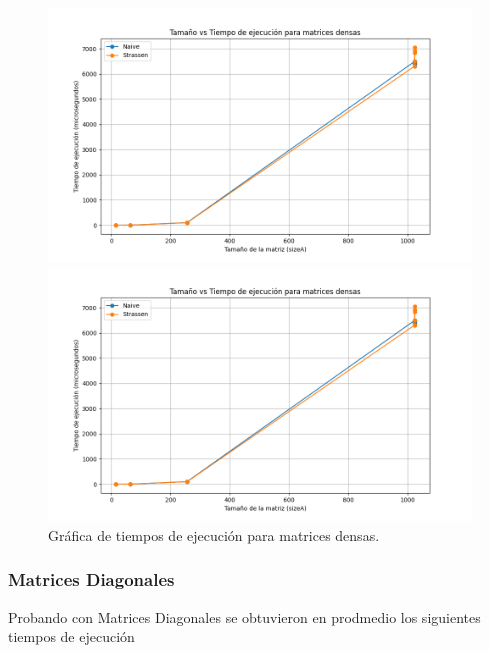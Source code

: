 \begin{figure}[H]
    \centering
    \begin{minipage}[t]{0.5\textwidth}
        \includegraphics[width=\textwidth]{../code/matrix_multiplication/data/plots/dense_matrices_plot.png}
    \end{minipage}%
    \begin{minipage}[t]{0.5\textwidth}
        \includegraphics[width=\textwidth]{../code/matrix_multiplication/data/plots/dense_matrices_plot.png}
     \end{minipage}%
    \caption{Gráfica de tiempos de ejecución para matrices densas.}
    \label{fig:multi_densa}
\end{figure}

\subsubsection*{Matrices Diagonales}

Probando con Matrices Diagonales  se obtuvieron en prodmedio los siguientes tiempos de ejecución

